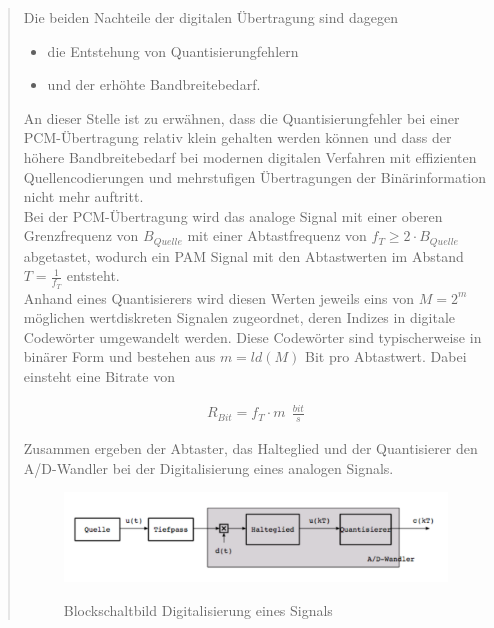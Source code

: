 \begin{quote}
	\vspace{1em}
	
	Die beiden Nachteile der digitalen Übertragung sind dagegen
	\begin{itemize}
		\item die Entstehung von Quantisierungfehlern
		\item und der erhöhte Bandbreitebedarf.
	\end{itemize}
	
	\vspace{0.5em}
	
	An dieser Stelle ist zu erwähnen, dass die Quantisierungfehler bei einer
	PCM-Übertragung relativ klein gehalten werden können und dass der höhere
	Bandbreitebedarf bei modernen digitalen Verfahren mit effizienten
	Quellencodierungen und mehrstufigen Übertragungen der Binärinformation nicht
	mehr auftritt.\\
	
	Bei der PCM-Übertragung wird das analoge Signal mit einer
	oberen Grenzfrequenz von $B_{Quelle}$ mit einer Abtastfrequenz von $f_T \geq 2
	\cdot B_{Quelle}$ abgetastet, wodurch ein PAM Signal mit den Abtastwerten im
	Abstand $T = \frac{1}{f_T}$ entsteht.\\
	Anhand eines Quantisierers wird diesen Werten jeweils eins von $M = 2^m$ möglichen wertdiskreten Signalen zugeordnet,
	deren Indizes in digitale Codewörter umgewandelt werden. Diese Codewörter sind
	typischerweise in binärer Form und bestehen aus $m = ld(M)$ Bit pro Abtastwert.
	Dabei einsteht eine Bitrate von
	
       \begin{equation*}
        	\begin{split}
        		R_{Bit} = f_T \cdot m \ \ \frac{bit}{s}
        	\end{split}
        \end{equation*}        
    
	\vspace{0.5em}
	   
	Zusammen ergeben der Abtaster, das Halteglied und der Quantisierer den
	A/D-Wandler bei der Digitalisierung eines analogen Signals.\\
	
	\begin{figure}[H]
    \centering
        \includegraphics[scale=0.7, trim = 0cm 0cm 0cm 0cm, clip]{./Bilder/Digitalisierung_des_Signals}
            \caption{Blockschaltbild Digitalisierung eines Signals}
            \cite{Digitalisierung_des_Signals}
    \end{figure}
    

\end{quote}
